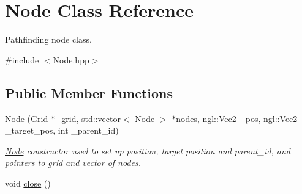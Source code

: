 \hypertarget{class_node}{}\section{Node Class Reference}
\label{class_node}


Pathfinding node class.  




{\ttfamily \#include $<$Node.\+hpp$>$}

\subsection*{Public Member Functions}
\begin{DoxyCompactItemize}
\item 
\hyperlink{class_node_a892b1a884acf99dc73e1e7c125c259bc}{Node} (\hyperlink{class_grid}{Grid} $\ast$\+\_\+grid, std\+::vector$<$ \hyperlink{class_node}{Node} $>$ $\ast$nodes, ngl\+::\+Vec2 \+\_\+pos, ngl\+::\+Vec2 \+\_\+target\+\_\+pos, int \+\_\+parent\+\_\+id)
\begin{DoxyCompactList}\small\item\em \hyperlink{class_node}{Node} constructor used to set up position, target position and parent\+\_\+id, and pointers to grid and vector of nodes. \end{DoxyCompactList}\item 
\hypertarget{class_node_af8cfc7b3fb2f102914daa5fc3b9c52f6}{}void \hyperlink{class_node_af8cfc7b3fb2f102914daa5fc3b9c52f6}{close} ()\label{class_node_af8cfc7b3fb2f102914daa5fc3b9c52f6}


\end{DoxyCompactItemize}
